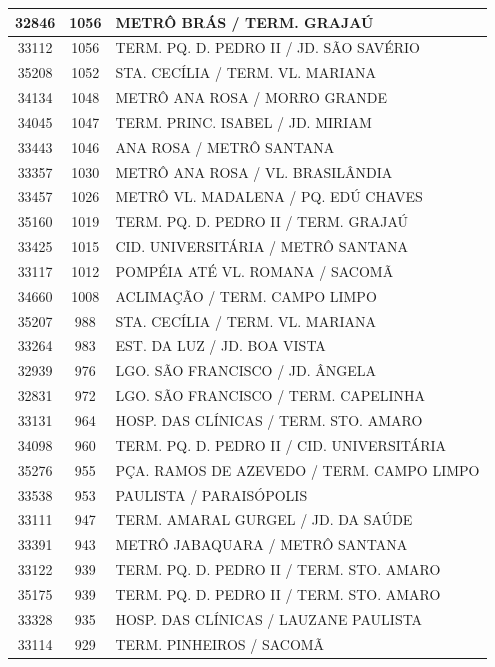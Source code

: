 \documentclass[
	12pt,				%
	oneside,			%
	a4paper,			%
	english,			%
	brazil				%
	]{abntex2ppgsi}
\begin{document}
{{\begin{apendicesenv}
\begin{longtable}{c|c|p{7cm}}
 \hline 
32846 &	1056 &	METRÔ BRÁS / TERM. GRAJAÚ \\ 
 \hline 
33112 &	1056 &	TERM. PQ. D. PEDRO II / JD. SÃO SAVÉRIO \\ 
 \hline 
35208 &	1052 &	STA. CECÍLIA / TERM. VL. MARIANA \\ 
 \hline 
34134 &	1048 &	METRÔ ANA ROSA / MORRO GRANDE \\ 
 \hline 
34045 &	1047 &	TERM. PRINC. ISABEL / JD. MIRIAM \\ 
 \hline 
33443 &	1046 &	ANA ROSA / METRÔ SANTANA \\ 
 \hline 
33357 &	1030 &	METRÔ ANA ROSA / VL. BRASILÂNDIA \\ 
 \hline 
33457 &	1026 &	METRÔ VL. MADALENA / PQ. EDÚ CHAVES \\ 
 \hline 
35160 &	1019 &	TERM. PQ. D. PEDRO II / TERM. GRAJAÚ \\ 
 \hline 
33425 &	1015 &	CID. UNIVERSITÁRIA / METRÔ SANTANA \\ 
 \hline 
33117 &	1012 &	POMPÉIA ATÉ VL. ROMANA / SACOMÃ \\ 
 \hline 
34660 &	1008 &	ACLIMAÇÃO / TERM. CAMPO LIMPO \\ 
 \hline 
35207 &	988 &	STA. CECÍLIA / TERM. VL. MARIANA \\ 
 \hline 
33264 &	983 &	EST. DA LUZ / JD. BOA VISTA \\ 
 \hline 
32939 &	976 &	LGO. SÃO FRANCISCO / JD. ÂNGELA \\ 
 \hline 
32831 &	972 &	LGO. SÃO FRANCISCO / TERM. CAPELINHA \\ 
 \hline 
33131 &	964 &	HOSP. DAS CLÍNICAS / TERM. STO. AMARO \\ 
 \hline 
34098 &	960 &	TERM. PQ. D. PEDRO II / CID. UNIVERSITÁRIA \\ 
 \hline 
35276 &	955 &	PÇA. RAMOS DE AZEVEDO / TERM. CAMPO LIMPO \\ 
 \hline 
33538 &	953 &	PAULISTA / PARAISÓPOLIS \\ 
 \hline 
33111 &	947 &	TERM. AMARAL GURGEL / JD. DA SAÚDE \\ 
 \hline 
33391 &	943 &	METRÔ JABAQUARA / METRÔ SANTANA \\ 
 \hline 
33122 &	939 &	TERM. PQ. D. PEDRO II / TERM. STO. AMARO \\ 
 \hline 
35175 &	939 &	TERM. PQ. D. PEDRO II / TERM. STO. AMARO \\ 
 \hline 
33328 &	935 &	HOSP. DAS CLÍNICAS / LAUZANE PAULISTA \\ 
 \hline 
33114 &	929 &	TERM. PINHEIROS / SACOMÃ \\ 

\end{longtable}
\end{apendicesenv}}}
\end{document}
